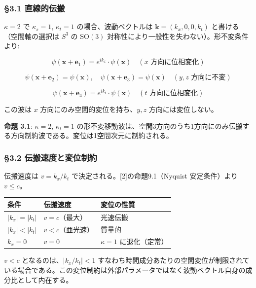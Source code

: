 \documentclass[
  a4paper,11pt]{ltjsarticle}
\newcounter{none}
\theoremstyle{definition}
\theoremstyle{remark}
\begin{document}
\subsubsection{§3.1 直線的伝搬}\label{ux76f4ux7ddaux7684ux4f1dux642c}

\(\kappa = 2\) で \(\kappa_s = 1\), \(\kappa_t = 1\)
の場合、波動ベクトルは \(\mathbf{k} = (k_x, 0, 0, k_t)\)
と書ける（空間軸の選択は \(S^3\) の \(\mathrm{SO}(3)\)
対称性により一般性を失わない）。形不変条件より:

\[\psi(\mathbf{x} + \mathbf{e}_1) = e^{ik_x} \cdot \psi(\mathbf{x}) \quad (\text{$x$ 方向に位相変化})\]

\[\psi(\mathbf{x} + \mathbf{e}_2) = \psi(\mathbf{x}), \quad \psi(\mathbf{x} + \mathbf{e}_3) = \psi(\mathbf{x}) \quad (\text{$y, z$ 方向に不変})\]

\[\psi(\mathbf{x} + \mathbf{e}_4) = e^{ik_t} \cdot \psi(\mathbf{x}) \quad (\text{$t$ 方向に位相変化})\]

この波は \(x\) 方向にのみ空間的変位を持ち、\(y, z\) 方向には変位しない。

\textbf{命題 3.1}: \(\kappa = 2\), \(\kappa_t = 1\)
の形不変移動波は、空間3方向のうち1方向にのみ伝搬する方向制約波である。変位は1空間次元に制約される。

\subsubsection{§3.2
伝搬速度と変位制約}\label{ux4f1dux642cux901fux5ea6ux3068ux5909ux4f4dux5236ux7d04}

伝搬速度は \(v = k_x / k_t\) で決定される。{[}2{]}の命題9.1（Nyquist
安定条件）より \(v \leq c\)。

{\def\LTcaptype{none} %
\begin{longtable}[]{@{}lll@{}}
\toprule\noalign{}
条件 & 伝搬速度 & 変位の性質 \\
\midrule\noalign{}
\endhead
\bottomrule\noalign{}
\endlastfoot
\(|k_x| = |k_t|\) & \(v = c\)（最大） & 光速伝搬 \\
\(|k_x| < |k_t|\) & \(v < c\)（亜光速） & 質量的 \\
\(k_x = 0\) & \(v = 0\) & \(\kappa = 1\) に退化（定常） \\
\end{longtable}
}

\(v < c\) となるのは、\(|k_x / k_t| < 1\)
すなわち時間成分あたりの空間変位が制限されている場合である。この変位制約は外部パラメータではなく波動ベクトル自身の成分比として内在する。
\end{document}
